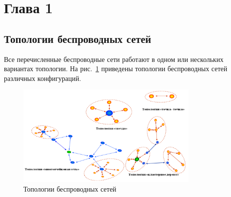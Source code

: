 \documentclass[a4paper,12pt]{article}
\begin{document}

\newpage

\section{Глава 1}

\subsection{Топологии беспроводных сетей}
Все перечисленные беспроводные сети работают в одном или нескольких вариантах
топологии. На рис.~\ref{fig:topologies} приведены топологии беспроводных сетей различных конфигураций.

\begin{figure}[h]
    \centering
    \includegraphics[width=0.8\textwidth]{images/Fig06.png}
    \caption{Топологии беспроводных сетей \cite{wirelessNetProtocols} }
    \label{fig:topologies}
\end{figure}
\end{document}
